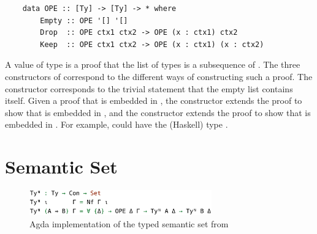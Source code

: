 \begin{lstlisting}
    data OPE :: [Ty] -> [Ty] -> * where
        Empty :: OPE '[] '[]
        Drop  :: OPE ctx1 ctx2 -> OPE (x : ctx1) ctx2
        Keep  :: OPE ctx1 ctx2 -> OPE (x : ctx1) (x : ctx2)
\end{lstlisting}

A value of type  is a proof that the list of types  is a subsequence of . The three constructors of  correspond to the different ways of constructing such a proof. The  constructor corresponds to the trivial statement that the empty list contains itself. Given a proof that  is embedded in , the  constructor extends the proof to show that  is embedded in , and the  constructor extends the proof to show that  is embedded in . For example,  could have the (Haskell) type .



\section{Semantic Set}

\begin{figure}[h]
    \centering
    \includegraphics[width=0.7\textwidth]{./images/typed_semantic_set.png}
    \caption{Agda implementation of the typed semantic set from \cite{AgdaNbe}}
    \label{fig:agdaSemanticSet}
\end{figure}



